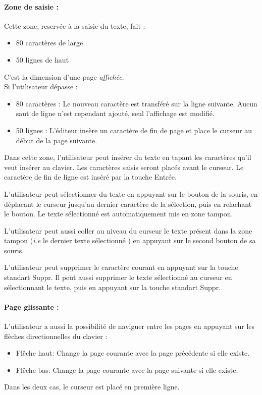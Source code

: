 \paragraph{Zone de saisie :} Cette zone, reservée à la saisie du texte, fait :
\begin{itemize}
	\item 80 caractères de large
	\item 50 lignes de haut
\end{itemize}
C'est la dimension d'une page \emph{affichée}.\\

Si l'utilisateur dépasse :
\begin{itemize}
	\item 80 caractères : Le nouveau caractère est transféré sur la ligne suivante. Aucun saut de ligne n'est cependant ajouté, seul l'affichage est modifié.
	\item 50 lignes : L'éditeur insère un caractère de fin de page et place le curseur au début de la page suivante.\\
\end{itemize}

Dans cette zone, l'utilisateur peut insérer du texte en tapant les caractères qu'il veut insérer au clavier. Les caractères saisis seront placés avant le curseur. Le caractère de fin de ligne est inséré par la touche \og Entrée\fg.

L'utilisateur peut sélectionner du texte en appuyant sur le bouton de la souris, en déplacant le curseur jusqu'au dernier caractère de la sélection, puis en relachant le bouton. Le texte sélectionné est automatiquement mis en zone tampon.

L'utilisateur peut aussi coller au niveau du curseur le texte présent dans la zone tampon (\textsl{i.e} le dernier texte sélectionné ) en appuyant sur le second bouton de sa souris.

L'utilisateur peut supprimer le caractère courant en appuyant sur la touche standart \og Suppr\fg. Il peut aussi supprimer le texte sélectionné au curseur en sélectionnant le texte, puis en appuyant sur la touche standart \og Suppr\fg.

\paragraph{Page glissante :}
L'utilisateur a aussi la possibilité de naviguer entre les pages en appuyant sur les flèches directionnelles du clavier :
\begin{itemize}
	\item \og Flêche haut\fg : Change la page courante avec la page précédente si elle existe.
	\item \og Flêche bas\fg : Change la page courante avec la page suivante si elle existe.
\end{itemize}
Dans les deux cas, le curseur est placé en première ligne.

